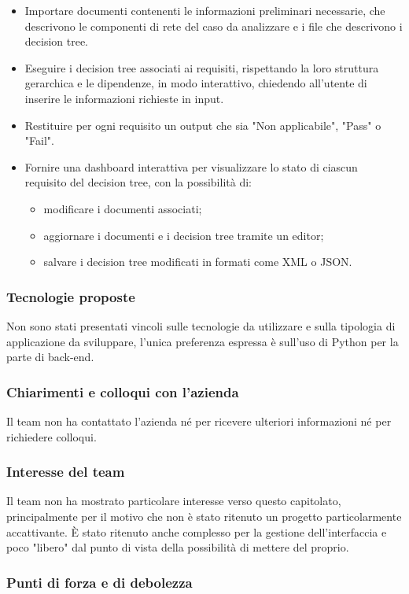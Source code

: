 \documentclass[a4paper,11pt]{article}
\begin{document}
\begin{itemize}[leftmargin=*]
  \item Importare documenti contenenti le informazioni preliminari necessarie, che descrivono le componenti di rete del caso da analizzare e i file che descrivono i decision tree.
  \item Eseguire i decision tree associati ai requisiti, rispettando la loro struttura gerarchica e le dipendenze, in modo interattivo, chiedendo all'utente di inserire le informazioni richieste in input.
  \item Restituire per ogni requisito un output che sia "Non applicabile", "Pass" o "Fail".
  \item Fornire una dashboard interattiva per visualizzare lo stato di ciascun requisito del decision tree, con la possibilità di:
  \begin{itemize}[leftmargin=*]
    \item modificare i documenti associati; 
    \item aggiornare i documenti e i decision tree tramite un editor; 
    \item salvare i decision tree modificati in formati come XML o JSON.
  \end{itemize}
\end{itemize}
\subsubsection{Tecnologie proposte}
Non sono stati presentati vincoli sulle tecnologie da utilizzare e sulla tipologia di applicazione da sviluppare, l'unica preferenza espressa è sull'uso di Python per la parte di back-end.
\subsubsection{Chiarimenti e colloqui con l'azienda}
Il team non ha contattato l'azienda né per ricevere ulteriori informazioni né per richiedere colloqui.
\subsubsection{Interesse del team}
Il team non ha mostrato particolare interesse verso questo capitolato, principalmente per il motivo che non è stato ritenuto un progetto particolarmente accattivante. È stato ritenuto anche complesso per la gestione dell'interfaccia e poco "libero" dal punto di vista della possibilità di mettere del proprio.
\newpage
\subsubsection{Punti di forza e di debolezza}
\end{document}
